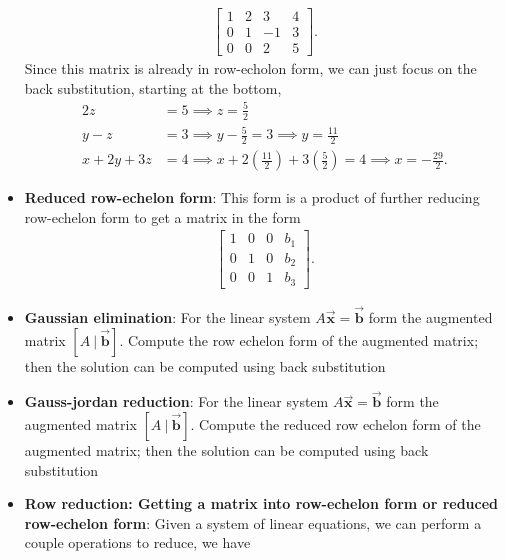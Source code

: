 \documentclass{report}
\begin{document}
\begin{itemize}
\begin{align*}
                    \left[\begin{array}{ccc|c}
                            1 & 2 & 3 & 4 \\
                            0 & 1 & -1 & 3 \\
                            0 & 0 & 2 & 5
                    \end{array}\right]
                .\end{align*}
                \bigbreak \noindent 
                Since this matrix is already in row-echolon form, we can just focus on the back substitution, starting at the bottom,
                \begin{align*}
                    2z &= 5 \implies z = \frac{5}{2}         \\
                    y - z &= 3 \implies y - \frac{5}{2} = 3 \implies y = \frac{11}{2} \\
                    x + 2y + 3z &= 4 \implies x + 2\left(\frac{11}{2}\right)  + 3 \left(\frac{5}{2}\right) = 4 \implies x = -\frac{29}{2}
                .\end{align*}
            \item \textbf{Reduced row-echelon form}: This form is a product of further reducing row-echelon form to get a matrix in the form
                \begin{align*}
                    \left[
                        \begin{array}{ccc|c}
                            1 & 0 & 0 & b_{1} \\
                            0 & 1 & 0 & b_{2} \\
                            0 & 0 & 1 & b_{3}
                        \end{array}
                    \right]
                .\end{align*}
            \item \textbf{Gaussian elimination}:  For the linear system $A\vec{\mathbf{x}} = \vec{\mathbf{b}}$ form the augmented matrix $[A\ |\ \vec{\mathbf{b}}]$. Compute the row echelon form of the augmented matrix; then the solution can be computed using back substitution
            \item \textbf{Gauss-jordan reduction}:  For the linear system $A\vec{\mathbf{x}} = \vec{\mathbf{b}}$ form the augmented matrix $[A\ |\ \vec{\mathbf{b}}]$. Compute the reduced row echelon form of the augmented matrix; then the solution can be computed using back substitution
            \item \textbf{Row reduction: Getting a matrix into row-echelon form or reduced row-echelon form}: Given a system of linear equations, we can perform a couple operations to reduce, we have

\end{itemize}
\end{document}
